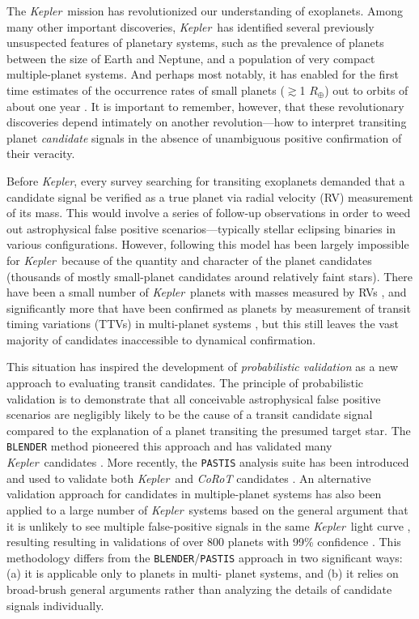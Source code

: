 \documentclass{emulateapj}
\newcommand{\kepler}{\textit{Kepler}}
\begin{document}
The \kepler\ mission has revolutionized our understanding of
exoplanets.  Among many other important discoveries, \kepler\ has
identified several previously unsuspected features of planetary
systems, such as the prevalence of planets between the size of Earth
and Neptune, and a population of very compact multiple-planet systems.
And perhaps most notably, it has enabled for the first time estimates
of the occurrence rates of small planets ($\gtrsim$1 $R_\oplus$) out
to orbits of about one year
\citep[e.g.][]{Petigura:2013,DFM:2014,Burke:2015}.  It is important to
remember, however, that these revolutionary discoveries depend
intimately on another revolution---how to interpret transiting planet
\textit{candidate} signals in the absence of unambiguous positive
confirmation of their veracity.

Before \kepler, every survey searching for transiting exoplanets
demanded that a candidate signal be verified as a true planet via
radial velocity (RV) measurement of its mass.  This would involve a
series of follow-up observations in order to weed out astrophysical
false positive scenarios---typically stellar eclipsing binaries in
various configurations.  However, following this model has been
largely impossible for \kepler\ because of the quantity and character
of the planet candidates (thousands of mostly small-planet candidates
around relatively faint stars).  There have been a small number of
\kepler\ planets with masses measured by RVs
\citep[e.g.,][]{Marcy:2014,Santerne:2015}, and significantly more that
have been confirmed as planets by measurement of transit timing
variations (TTVs) in multi-planet systems
\citep[e.g.,][]{Ford:2012,Steffen:2012,Fabrycky:2012,Steffen:2013,Jontof:2015},
but this still leaves the vast majority of candidates inaccessible to
dynamical confirmation.

This situation has inspired the development of \emph{probabilistic
validation} as a new approach to evaluating transit candidates.  The
principle of probabilistic validation is to demonstrate that all
conceivable astrophysical false positive scenarios are negligibly
likely to be the cause of a transit candidate signal compared to the
explanation of a planet transiting the presumed target star.  The
\verb|BLENDER| method pioneered this approach and has validated many
\kepler\ candidates
\citep[e.g.,][]{Borucki:2012,Kipping:2014,Torres:2015}.   More
recently, the \verb|PASTIS| analysis suite has been introduced
\citep{Diaz:2014} and used to validate both \kepler\ and
\textit{CoRoT} candidates \citep[e.g.,][]{Santerne:2014,Moutou:2014}.
An alternative validation approach for candidates in multiple-planet
systems has also been applied to a large number of \kepler\ systems
based on the general argument that it is unlikely to see multiple
false-positive signals in the same \kepler\ light curve
\citep{Lissauer:2012}, resulting resulting in validations of over 800
planets with 99\% confidence \citep{Lissauer:2014,Rowe:2014}. This
methodology differs from the \verb|BLENDER|/\verb|PASTIS| approach in
two significant ways: (a) it is applicable only to planets in multi-
planet systems, and (b) it relies on broad-brush general arguments
rather than analyzing the details of candidate signals individually.  
\end{document}

